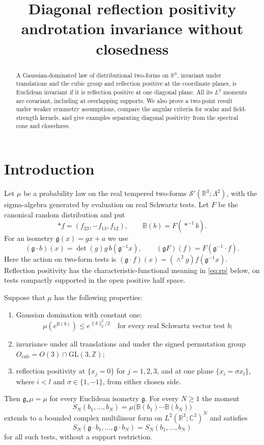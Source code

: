 \documentclass[11pt,letterpaper,reqno]{amsart}
\title[Diagonal positivity and rotation invariance]{Diagonal reflection positivity and\break rotation invariance without closedness}
\date{}
\makeatletter
\theoremstyle{definition}
\newcommand{\ms@majorstart}{%
  \pushQED{\qed}\renewcommand{\qedsymbol}{$\blacksquare\square$}}
\newenvironment{theorem}[1][]{\ms@majorstart\ms@theorem[#1]}
  {\popQED\endms@theorem}
\theoremstyle{remark}
\newcommand{\R}{\mathbb R}\newcommand{\C}{\mathbb C}
\newcommand{\Z}{\mathbb Z}\newcommand{\B}{\mathbb B}
\newcommand{\Ocub}{O_{\mathrm{cub}}}
\makeatother
\begin{document}
\begin{abstract}
A Gaussian-dominated law of distributional two-forms on $\R^3$, invariant
under translations and the cubic group and reflection positive at the
coordinate planes, is Euclidean invariant if it is reflection positive
at one diagonal plane. All its $L^2$ moments are covariant, including
at overlapping supports. We also prove a two-point result under weaker
symmetry assumptions, compare the angular criteria for scalar and
field-strength kernels, and give examples separating diagonal positivity
from the spectral cone and closedness.
\end{abstract}
\maketitle
\tableofcontents

\section{Introduction}\label{sec:introduction}

Let $\mu$ be a probability law on the real tempered two-forms
$\mathcal S'(\R^3;\Lambda^2)$, with the sigma-algebra generated by
evaluation on real Schwartz tests. Let $F$ be the canonical random
distribution and put
\[
 *f=(f_{23},-f_{13},f_{12}),\qquad \B(b)=F(*^{-1}b).
\]
For an isometry $\mathfrak g(x)=gx+a$ we use
\[
 (\mathfrak g\cdot b)(x)=\det(g)g\,b(\mathfrak g^{-1}x),\qquad
 (\mathfrak gF)(f)=F(\mathfrak g^{-1}\cdot f).
\]
Here the action on two-form tests is
$(\mathfrak g\cdot f)(x)=(\wedge^2g)f(\mathfrak g^{-1}x)$.
Reflection positivity has the characteristic-functional meaning in
\eqref{eq:rp} below, on tests compactly supported in the open positive
half space.

\begin{theorem}\label{thm:main}
Suppose that $\mu$ has the following properties:
\begin{enumerate}[label=\textup{(\roman*)}]
\item Gaussian domination with constant one:
\begin{equation}\tag{G}\label{eq:G}
 \mu(e^{\B(b)})\le e^{\|b\|_2^2/2}
 \quad\text{for every real Schwartz vector test }b;
\end{equation}
\item invariance under all translations and under the signed permutation
group $\Ocub=O(3)\cap\mathrm{GL}(3,\Z)$;
\item reflection positivity at $\{x_j=0\}$ for $j=1,2,3$, and at one
plane $\{x_i=\sigma x_l\}$, where $i<l$ and $\sigma\in\{1,-1\}$,
from either chosen side.
\end{enumerate}
Then $\mathfrak g_*\mu=\mu$ for every Euclidean isometry $\mathfrak g$.
For every $N\ge1$ the moment
\[
 S_N(b_1,\ldots,b_N)=\mu\bigl(\B(b_1)\cdots\B(b_N)\bigr)
\]
extends to a bounded complex multilinear form on
$L^2(\R^3;\C^3)^N$ and satisfies
\[
 S_N(\mathfrak g\cdot b_1,\ldots,\mathfrak g\cdot b_N)
   =S_N(b_1,\ldots,b_N)
\]
for all such tests, without a support restriction.
\end{theorem}
\end{document}
